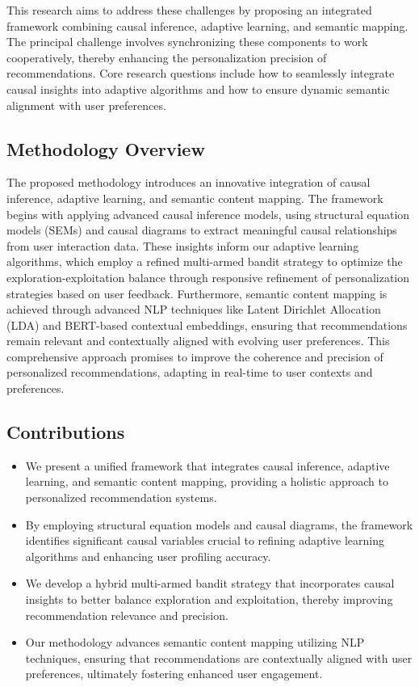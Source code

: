 This research aims to address these challenges by proposing an integrated framework combining causal inference, adaptive learning, and semantic mapping. The principal challenge involves synchronizing these components to work cooperatively, thereby enhancing the personalization precision of recommendations. Core research questions include how to seamlessly integrate causal insights into adaptive algorithms and how to ensure dynamic semantic alignment with user preferences.

\subsection{Methodology Overview}

The proposed methodology introduces an innovative integration of causal inference, adaptive learning, and semantic content mapping. The framework begins with applying advanced causal inference models, using structural equation models (SEMs) and causal diagrams to extract meaningful causal relationships from user interaction data. These insights inform our adaptive learning algorithms, which employ a refined multi-armed bandit strategy to optimize the exploration-exploitation balance through responsive refinement of personalization strategies based on user feedback. Furthermore, semantic content mapping is achieved through advanced NLP techniques like Latent Dirichlet Allocation (LDA) and BERT-based contextual embeddings, ensuring that recommendations remain relevant and contextually aligned with evolving user preferences. This comprehensive approach promises to improve the coherence and precision of personalized recommendations, adapting in real-time to user contexts and preferences.

\subsection{Contributions}

\begin{itemize}
    \item We present a unified framework that integrates causal inference, adaptive learning, and semantic content mapping, providing a holistic approach to personalized recommendation systems.
    \item By employing structural equation models and causal diagrams, the framework identifies significant causal variables crucial to refining adaptive learning algorithms and enhancing user profiling accuracy.
    \item We develop a hybrid multi-armed bandit strategy that incorporates causal insights to better balance exploration and exploitation, thereby improving recommendation relevance and precision.
    \item Our methodology advances semantic content mapping utilizing NLP techniques, ensuring that recommendations are contextually aligned with user preferences, ultimately fostering enhanced user engagement.
\end{itemize}
